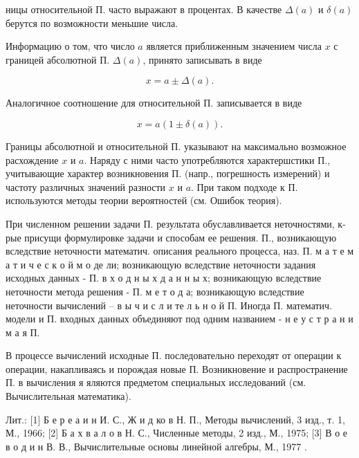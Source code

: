 \documentclass[10pt]{article}
\begin{document}
ницы относительной П. часто выражают в процентах. В качестве $\Delta(a)$ и $\delta(a)$ берутся по возможности меньшие числа.



Информацию о том, что число $a$ является приближенным значением числа $x$ с границей абсолютной П. $\Delta(a)$, принято записывать в виде



\[

x=a \pm \Delta(a) .

\]



Аналогичное соотношение для относительной П. записывается в виде



\[

x=a(1 \pm \delta(a)) .

\]



Границы абсолютной и относительной П. указывают на максимально возможное расхождение $x$ и $a$. Наряду с ними часто употребляются характершстики П., учитывающие характер возникновения П. (напр., погрешность измерений) и частоту различных значений разности $x$ и $a$. При таком подходе к П. используются методы теории вероятностей (см. Ошибок теория).



При численном решении задачи П. результата обуславливается неточностями, к-рые присущи формулировке задачи и способам ее решения. П., возникающую вследствие неточности математич. описания реального процесса, наз. П. м а т е м а т и ч е с к о й м о де ли; возникающую вследствие неточности задания исходных данных - П. в х о д н ы х д а н н ы х; возникающую вследствие неточности метода решения - П. м е т о д а; возникающую вследствие неточности вычислений -- в ы ч и с л и те л ь н о й П. Иногда П. математич. модели и П. входных данных объединяют под одним названием - н е у с т р а н и м а я П.



В процессе вычислений исходные П. последовательно переходят от операции к операции, накапливаясь и порождая новые П. Возникновение и распространение П. в вычисления я яляются предметом специальных исследований (см. Вычислительная математика).



Лит.: [1] Б е р е а и н И. С., Ж и д ко в Н. П., Методы вычислений, 3 изд., т. 1, М., 1966; [2] Б а х в а л о в Н. С., Численные методы, 2 изд., М., 1975; [3] В о е в о д и н В. В., Вычислительные основы линейной алгебры, М., 1977 .
\end{document}
